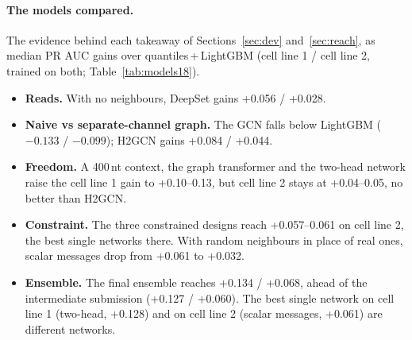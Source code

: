 \documentclass[11pt,a4paper]{article}
\begin{document}
\paragraph{The models compared.}
The evidence behind each takeaway of Sections~\ref{sec:dev} and~\ref{sec:reach}, as median PR AUC
gains over quantiles\,+\,LightGBM (cell line 1 / cell line 2, trained on both;
Table~\ref{tab:models18}).
\begin{itemize}
    \item \textbf{Reads.} With no neighbours, DeepSet gains +0.056 / +0.028.
    \item \textbf{Naive vs separate-channel graph.} The GCN falls below
    LightGBM ($-0.133$ / $-0.099$); H2GCN gains +0.084 / +0.044.
    \item \textbf{Freedom.} A 400\,nt context, the graph transformer and the
    two-head network raise the cell line 1 gain to +0.10--0.13, but cell line
    2 stays at +0.04--0.05, no better than H2GCN.
    \item \textbf{Constraint.} The three constrained designs reach
    +0.057--0.061 on cell line 2, the best single networks there. With random
    neighbours in place of real ones, scalar messages drop from +0.061 to
    +0.032.
    \item \textbf{Ensemble.} The final ensemble reaches +0.134 / +0.068, ahead
    of the intermediate submission (+0.127 / +0.060). The best single network
    on cell line 1 (two-head, +0.128) and on cell line 2 (scalar messages,
    +0.061) are different networks.
\end{itemize}
\end{document}
